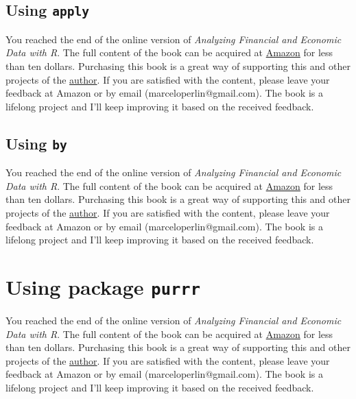 \documentclass[
  12pt,
]{book}
\newenvironment{pleasebuyit}
{\begin{noteblock}
		
	} {\end{noteblock}}
\begin{document}
\hypertarget{using-apply}{%
\subsection{\texorpdfstring{Using \texttt{apply}}{Using apply}}\label{using-apply}}

\begin{pleasebuyit}
You reached the end of the online version of \emph{Analyzing Financial
and Economic Data with R}. The full content of the book can be acquired
at \href{https://www.amazon.com/dp/B084LSNXMN}{Amazon} for less than ten
dollars. Purchasing this book is a great way of supporting this and
other projects of the \href{https://www.msperlin.com/}{author}. If you
are satisfied with the content, please leave your feedback at Amazon or
by email (marceloperlin@gmail.com). The book is a lifelong project and
I'll keep improving it based on the received feedback.
\end{pleasebuyit}

\hypertarget{using-by}{%
\subsection{\texorpdfstring{Using \texttt{by}}{Using by}}\label{using-by}}

\begin{pleasebuyit}
You reached the end of the online version of \emph{Analyzing Financial
and Economic Data with R}. The full content of the book can be acquired
at \href{https://www.amazon.com/dp/B084LSNXMN}{Amazon} for less than ten
dollars. Purchasing this book is a great way of supporting this and
other projects of the \href{https://www.msperlin.com/}{author}. If you
are satisfied with the content, please leave your feedback at Amazon or
by email (marceloperlin@gmail.com). The book is a lifelong project and
I'll keep improving it based on the received feedback.
\end{pleasebuyit}

\hypertarget{using-package-purrr}{%
\section{\texorpdfstring{Using package \texttt{purrr}}{Using package purrr}}\label{using-package-purrr}}

\begin{pleasebuyit}
You reached the end of the online version of \emph{Analyzing Financial
and Economic Data with R}. The full content of the book can be acquired
at \href{https://www.amazon.com/dp/B084LSNXMN}{Amazon} for less than ten
dollars. Purchasing this book is a great way of supporting this and
other projects of the \href{https://www.msperlin.com/}{author}. If you
are satisfied with the content, please leave your feedback at Amazon or
by email (marceloperlin@gmail.com). The book is a lifelong project and
I'll keep improving it based on the received feedback.
\end{pleasebuyit}
\end{document}
